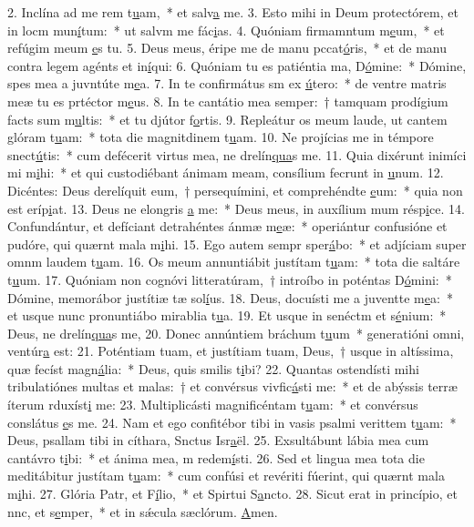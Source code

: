 2. Inclína ad me rem t\uline{u}am,~* et salv\uline{a} me.
3. Esto mihi in Deum protectórem, et in locm mun\uline{í}tum:~* ut salvm me fác\uline{i}as.
4. Quóniam firmamntum m\uline{e}um,~* et refúgim meum \uline{e}s tu.
5. Deus meus, éripe me de manu pccat\uline{ó}ris,~* et de manu contra legem agénts et in\uline{í}qui:
6. Quóniam tu es patiéntia ma, D\uline{ó}mine:~* Dómine, spes mea a juvntúte m\uline{e}a.
7. In te confirmátus sm ex \uline{ú}tero:~* de ventre matris meæ tu es prtéctor m\uline{e}us.
8. In te cantátio mea semper:~† tamquam prodígium facts sum m\uline{u}ltis:~* et tu djútor f\uline{o}rtis.
9. Repleátur os meum laude, ut cantem glóram t\uline{u}am:~* tota die magnitdinem t\uline{u}am.
10. Ne projícias me in témpore snect\uline{ú}tis:~* cum defécerit virtus mea, ne drelín\uline{qua}s me.
11. Quia dixérunt inimíci mi m\uline{i}hi:~* et qui custodiébant ánimam meam, consílium fecrunt in \uline{u}num.
12. Dicéntes: Deus derelíquit eum,~† persequímini, et comprehéndte \uline{e}um:~* quia non est  eríp\uline{i}at.
13. Deus ne elongris \uline{a} me:~* Deus meus, in auxílium mum résp\uline{i}ce.
14. Confundántur, et defíciant detrahéntes ánmæ m\uline{e}æ:~* operiántur confusióne et pudóre, qui quærnt mala m\uline{i}hi.
15. Ego autem sempr sper\uline{á}bo:~* et adjíciam super omnm laudem t\uline{u}am.
16. Os meum annuntiábit justítam t\uline{u}am:~* tota die saltáre t\uline{u}um.
17. Quóniam non cognóvi litteratúram,~† introíbo in poténtas D\uline{ó}mini:~* Dómine, memorábor justítiæ tæ sol\uline{í}us.
18. Deus, docuísti me a juventte m\uline{e}a:~* et usque nunc pronuntiábo mirablia t\uline{u}a.
19. Et usque in senéctm et s\uline{é}nium:~* Deus, ne drelín\uline{qua}s me,
20. Donec annúntiem bráchum t\uline{u}um~* generatióni omni,  ventúr\uline{a} est:
21. Poténtiam tuam, et justítiam tuam, Deus,~† usque in altíssima, quæ fecíst magn\uline{á}lia:~* Deus, quis smilis t\uline{i}bi?
22. Quantas ostendísti mihi tribulatiónes multas et malas:~† et convérsus vivfic\uline{á}sti me:~* et de abýssis terræ íterum rduxíst\uline{i} me:
23. Multiplicásti magnificéntam t\uline{u}am:~* et convérsus conslátus \uline{e}s me.
24. Nam et ego confitébor tibi in vasis psalmi verittem t\uline{u}am:~* Deus, psallam tibi in cíthara, Snctus Isr\uline{a}ël.
25. Exsultábunt lábia mea cum cantávro t\uline{i}bi:~* et ánima mea, m redem\uline{í}sti.
26. Sed et lingua mea tota die meditábitur justítam t\uline{u}am:~* cum confúsi et revériti fúerint, qui quærnt mala m\uline{i}hi.
27. Glória Patr, et F\uline{í}lio,~* et Spirtui S\uline{a}ncto.
28. Sicut erat in princípio, et nnc, et s\uline{e}mper,~* et in sǽcula sæclórum. \uline{A}men.

